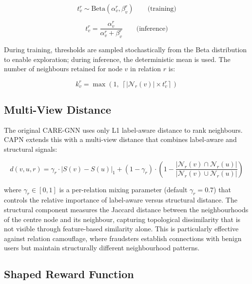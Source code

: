 \begin{equation}
t_v^r \sim \text{Beta}(\alpha_v^r, \beta_v^r) \qquad \text{(training)}
\end{equation}

\begin{equation}
t_v^r = \frac{\alpha_v^r}{\alpha_v^r + \beta_v^r} \qquad \text{(inference)}
\end{equation}

\noindent
During training, thresholds are sampled stochastically from the Beta distribution to enable exploration; during inference, the deterministic mean is used. The number of neighbours retained for node \( v \) in relation \( r \) is:

\begin{equation}
k_v^r = \max\left(1, \; \left\lceil |\mathcal{N}_r(v)| \times t_v^r \right\rceil \right)
\end{equation}

\subsection{Multi-View Distance}

The original CARE-GNN uses only L1 label-aware distance to rank neighbours. CAPN extends this with a multi-view distance that combines label-aware and structural signals:

\begin{equation}
d(v, u, r) = \gamma_r \cdot |S(v) - S(u)|_1 + (1 - \gamma_r) \cdot \left(1 - \frac{|\mathcal{N}_r(v) \cap \mathcal{N}_r(u)|}{|\mathcal{N}_r(v) \cup \mathcal{N}_r(u)|}\right)
\end{equation}

\noindent
where \( \gamma_r \in [0, 1] \) is a per-relation mixing parameter (default \( \gamma_r = 0.7 \)) that controls the relative importance of label-aware versus structural distance. The structural component measures the Jaccard distance between the neighbourhoods of the centre node and its neighbour, capturing topological dissimilarity that is not visible through feature-based similarity alone. This is particularly effective against relation camouflage, where fraudsters establish connections with benign users but maintain structurally different neighbourhood patterns.

\subsection{Shaped Reward Function}


